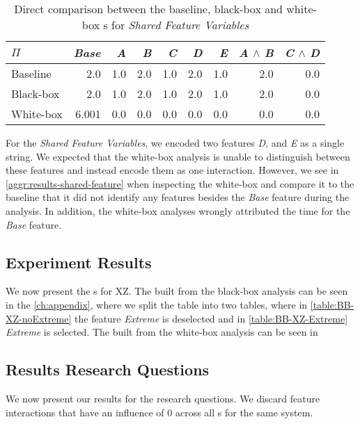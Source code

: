 \begin{table}[H]
    \centering
    \begin{tabular}{lrrrrrrrr}
    \toprule
    $\Pi$    & \emph{Base} & \emph{A} & \emph{B} & \emph{C} & \emph{D} & \emph{E}& \emph{A} $\land$ \emph{B} & \emph{C} $\land$ \emph{D}  \\ \midrule
    Baseline & 2.0    & 1.0 & 2.0 & 1.0 & 2.0 & 1.0 & 2.0           & 0.0           \\
    Black-box &  2.0    & 1.0 & 2.0 & 1.0 & 2.0 & 1.0 & 2.0           & 0.0           \\
    White-box  &  6.001 &  0.0 &  0.0 &  0.0 &  0.0 &  0.0 &     0.0 &     0.0\\\bottomrule
    \end{tabular}  
    \caption{Direct comparison between the baseline, black-box and white-box {\perfInfluenceModel}s for \emph{Shared Feature Variables}}
    \label{aggr:results-shared-feature}
\end{table}

For the \emph{Shared Feature Variables}, we encoded two features \emph{D}, and \emph{E} as a single string. 
We expected that the white-box analysis is unable to distinguish between these features and instead encode them as one interaction. 
However, we see in \autoref{aggr:results-shared-feature} when inspecting the white-box {\perfInfluenceModel}
and compare it to the baseline that it did not identify any features besides the \emph{Base} feature during the analysis. 
In addition, the white-box analyses {\perfInfluenceModel} wrongly attributed the time for the \emph{Base} feature.

\subsection{Experiment Results}

We now present the {\perfInfluenceModel}s for \textsc{XZ}. The {\perfInfluenceModel} built from the black-box analysis can be seen
in the \autoref{ch:appendix}, where we split the table into two tables, where in \autoref{table:BB-XZ-noExtreme} the feature \emph{Extreme} is 
deselected and in \autoref{table:BB-XZ-Extreme} \emph{Extreme} is selected. The {\perfInfluenceModel} built from the white-box analysis 
can be seen in %

\subsection{Results Research Questions}
We now present our results for the research questions. We discard feature interactions that have an influence of 0 
across all {\perfInfluenceModel}s for the same system.

